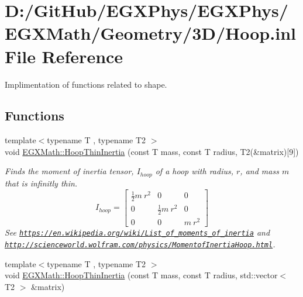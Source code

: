 \hypertarget{_hoop_8inl}{}\section{D\+:/\+Git\+Hub/\+E\+G\+X\+Phys/\+E\+G\+X\+Phys/\+E\+G\+X\+Math/\+Geometry/3\+D/\+Hoop.inl File Reference}
\label{_hoop_8inl}


Implimentation of functions related to shape.  


\subsection*{Functions}
\begin{DoxyCompactItemize}
\item 
{\footnotesize template$<$typename T , typename T2 $>$ }\\void \mbox{\hyperlink{group___e_g_x_math-_geometry-3_d-_hoop_gab3a84dc2aa29ce0db990425747d291c6}{E\+G\+X\+Math\+::\+Hoop\+Thin\+Inertia}} (const T mass, const T radius, T2(\&matrix)\mbox{[}9\mbox{]})
\begin{DoxyCompactList}\small\item\em Finds the moment of inertia tensor, $I_{hoop}$ of a hoop with radius, $r$, and mass $m$ that is infinitly thin. \[ I_{hoop}=\begin{bmatrix} \frac{1}{2}m\ r^2 & 0 & 0\\ 0 & \frac{1}{2}m\ r^2 & 0\\ 0 & 0 & m\ r^2 \end{bmatrix} \] See \href{https://en.wikipedia.org/wiki/List_of_moments_of_inertia}{\tt https\+://en.\+wikipedia.\+org/wiki/\+List\+\_\+of\+\_\+moments\+\_\+of\+\_\+inertia} and \href{http://scienceworld.wolfram.com/physics/MomentofInertiaHoop.html}{\tt http\+://scienceworld.\+wolfram.\+com/physics/\+Momentof\+Inertia\+Hoop.\+html}. \end{DoxyCompactList}\item 
{\footnotesize template$<$typename T , typename T2 $>$ }\\void \mbox{\hyperlink{group___e_g_x_math-_geometry-3_d-_hoop_ga0bc0b59dbaad05d7dd184d710f99b199}{E\+G\+X\+Math\+::\+Hoop\+Thin\+Inertia}} (const T mass, const T radius, std\+::vector$<$ T2 $>$ \&matrix)

\end{DoxyCompactItemize}

